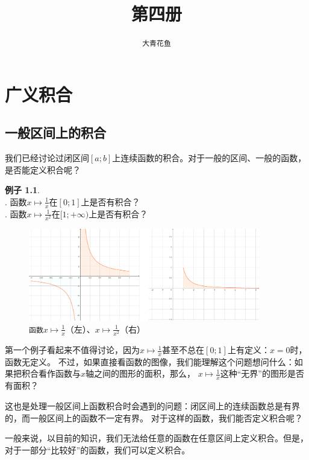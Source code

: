 \documentclass[12pt,UTF8]{ctexbook}
\title{\zihao{0} \bfseries 第四册}
\author{\zihao{2} \texttt{大青花鱼}}
\date{}
\theoremstyle{definition}
\newtheorem{ex}{例子}[section]
\theoremstyle{plain}
\begin{document}
\maketitle
\tableofcontents
\newpage

\chapter{广义积合}

\section{一般区间上的积合}

我们已经讨论过闭区间$[a;b]$上连续函数的积合。对于一般的区间、一般的函数，是否能定义积合呢？

\begin{ex}
    \mbox{} \\
    . 函数$x\mapsto\frac{1}{x}$在$[0;1]$上是否有积合？\\
    . 函数$x\mapsto\frac{1}{x^2}$在$[1;+\infty)$上是否有积合？
\end{ex}

\begin{figure}[h] %
    \vspace{4pt}
    \centering
    \includegraphics[width=0.9\textwidth]{tu/广义积分1.png}
    \caption*{\texttt{函数}$x\mapsto\frac{1}{x}$（左）、$x\mapsto\frac{1}{x^2}$（右）}
\end{figure}

第一个例子看起来不值得讨论，因为$x\mapsto\frac{1}{x}$甚至不总在$[0;1]$上有定义：$x=0$时，函数无定义。
不过，如果直接看函数的图像，我们能理解这个问题想问什么：如果把积合看作函数与$x$轴之间的图形的面积，那么，
$x\mapsto\frac{1}{x}$这种“无界”的图形是否有面积？

这也是处理一般区间上函数积合时会遇到的问题：闭区间上的连续函数总是有界的，而一般区间上的函数不一定有界。
对于这样的函数，我们能否定义积合呢？

一般来说，以目前的知识，我们无法给任意的函数在任意区间上定义积合。但是，对于一部分“比较好”的函数，我们可以定义积合。
\end{document}
